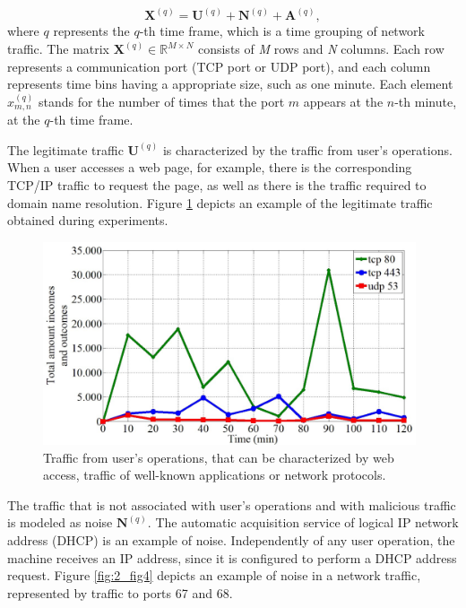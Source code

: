 \begin{equation}\label{eq:eq01}
	\boldsymbol{X}^{(q)} = \boldsymbol{U}^{(q)} + \boldsymbol{N}^{(q)} + \boldsymbol{A}^{(q)},
\end{equation}
where $q$ represents the $q$-th time frame, which is a time grouping of network traffic. The matrix $\boldsymbol{X}^{(q)} \in \mathbb{R}^{M \times N}$ consists of \emph{M} rows and \emph{N} columns. Each row represents a communication port (TCP port or UDP port), and each column represents time bins having a appropriate size, such as one minute. Each element $x_{m,n}^{(q)}$ stands for the number of times that the port $m$ appears at the $n$-th minute, at the $q$-th time frame.

The legitimate traffic $\boldsymbol{U}^{(q)}$ is characterized by the traffic from user's operations. When a user accesses a web page, for example, there is the corresponding TCP/IP traffic to request the page, as well as there is the traffic required to domain name resolution. Figure \ref{fig:2_fig3} depicts an example of the legitimate traffic obtained during experiments.

\begin{figure}[h!]
     \centering 
     \includegraphics[width=11cm]{figures/fig03.png}
     \caption{Traffic from user's operations, that can be characterized by web access, traffic of well-known applications or network protocols.}
     \label{fig:2_fig3}
\end{figure}

The traffic that is not associated with user's operations and with malicious traffic is modeled as noise $\boldsymbol{N}^{(q)}$. The automatic acquisition service of logical IP network address (DHCP) is an example of noise. Independently of any user operation, the machine receives an IP address, since it is configured to perform a DHCP address request. Figure \ref{fig:2_fig4} depicts an example of noise in a network traffic, represented by traffic to ports 67 and 68.

